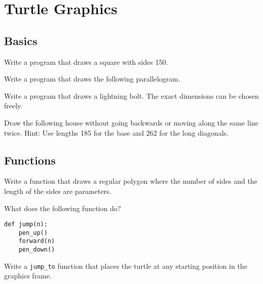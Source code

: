 \documentclass[11pt,a4paper]{report}
\begin{document}
\section{Turtle Graphics}




\subsection{Basics}

\begin{ex}
Write a program that draws a square with sides 150.
\end{ex}

\begin{ex}
Write a program that draws the following parallelogram.
\end{ex}

\begin{ex}
Write a program that draws a lightning bolt. The exact  dimensions can be chosen freely.
\end{ex}


\begin{ex}
Draw the following house without going backwards or moving along the same line twice. Hint: Use lengths 185 for the base and 262 for the long diagonals.
\end{ex}




\newpage
\subsection{Functions}
\begin{ex}
Write a function that draws a regular polygon where the number of sides and the length of the sides are parameters.
\end{ex}


\begin{ex}
What does the following function do?
\begin{lstlisting}
def jump(n):
    pen_up()
    forward(n)
    pen_down() \end{lstlisting}
\end{ex}


\begin{ex}
Write a \verb|jump_to| function that places the turtle at any starting position in the graphics frame.
\end{ex}
\end{document}
